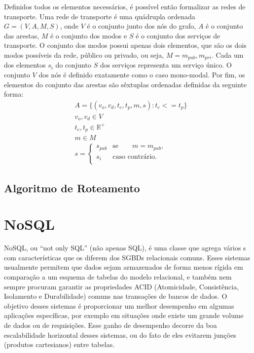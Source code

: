 Definidos todos os elementos necessários, é possível então formalizar as redes de transporte. Uma rede de transporte é uma quádrupla ordenada $G = (V, A, M, S)$, onde $V$ é o conjunto junto dos nós do grafo, $A$ é o conjunto das arestas, $M$ é o conjunto dos modos e $S$ é o conjunto dos serviços de transporte. O conjunto dos modos possui apenas dois elementos, que são os dois modos possíveis da rede, público ou privado, ou seja, $M = {m_{pub}, m_{pri}}$.
Cada um dos elementos $s_i$ do conjunto $S$ dos serviços representa um serviço único.
O conjunto $V$ dos nós é definido exatamente como o caso mono-modal. Por fim, os elementos do conjunto das arestas são sêxtuplas ordenadas definidas da seguinte forma:
\begin{align*}
& A = \{ (v_o, v_d, t_c, t_p, m, s) : t_c <= t_p \} \\
& v_o, v_d \in V \\
& t_c, t_p \in \mathbb{R^+} \\
& m \in M \\
& s = \left\{
	\begin{array}{cr}
		s_{pub} &  \text{se} \qquad m = m_{pub}, \\
		s_i  & \text{caso contrário}. \\
	\end{array}
	\right.
\end{align*}



\subsection{Algoritmo de Roteamento}

\section{NoSQL}

NoSQL, ou ``not only SQL'' (não apenas SQL), é uma classe que agrega vários s com características que os diferem dos SGBDs relacionais comuns.
Esses sistemas usualmente permitem que dados sejam armazenados de forma menos rígida em comparação a um esquema de tabelas do modelo relacional, e também nem sempre procuram garantir as propriedades ACID (Atomicidade, Consistência, Isolamento e Durabilidade) comuns nas transações de bancos de dados.
O objetivo desses sistemas é proporcionar um melhor desempenho em algumas aplicações específicas, por exemplo em situações onde existe um grande volume de dados ou de requisições. Esse ganho de desempenho decorre da boa escalabilidade horizontal desses sistemas, ou do fato de eles evitarem junções (produtos cartesianos) entre tabelas.


